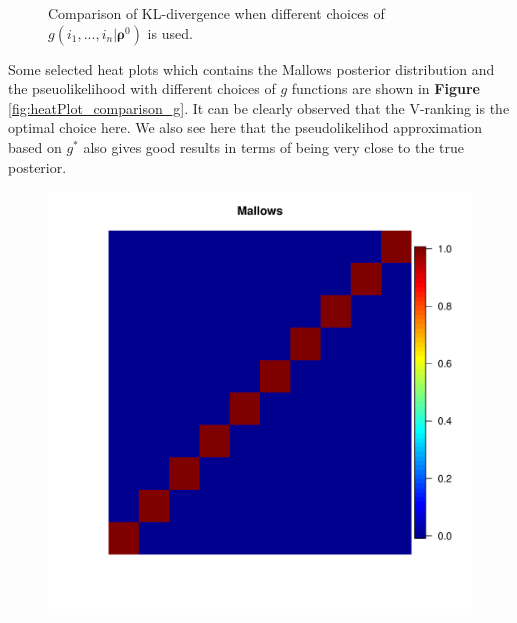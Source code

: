 \documentclass[11pt, oneside]{article}   	%
\begin{document}
\begin{figure}[h!]
\begin{minipage}[t]{.23\textwidth}
		\end{minipage} 
	
	
	\caption{Comparison of KL-divergence when different choices of $g(i_1, ...,i_n|\bm{\rho}^0)$ is used. }
	\label{fig:boxPlots}
\end{figure}

Some selected heat plots which contains the Mallows posterior distribution and the pseuolikelihood with different choices of $g$ functions are shown in \textbf{Figure }\ref{fig:heatPlot_comparison_g}.  It can be clearly observed that the V-ranking is the optimal choice here. We also see here that the pseudolikelihod approximation based on $g^*$ also gives good results in terms of being very close to the true posterior.
\begin{figure}[h!]

		\begin{minipage}[t]{.45\textwidth}
			\centering
			\includegraphics[width=\textwidth]{figures/theorem2_2/heat_Mallows_N2000n10alpha1run1.pdf}
			

\end{minipage}
\end{figure}
\end{document}

